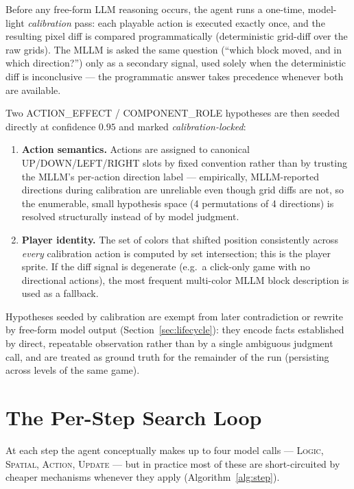 \documentclass{article}
\begin{document}
Before any free-form LLM reasoning occurs, the agent runs a one-time,
model-light \emph{calibration} pass: each playable action is executed
exactly once, and the resulting pixel diff is compared programmatically
(deterministic grid-diff over the raw grids). The MLLM is asked the same
question (``which block moved, and in which direction?'') only as a
secondary signal, used solely when the deterministic diff is
inconclusive — the programmatic answer takes precedence whenever both
are available.

Two ACTION\_EFFECT / COMPONENT\_ROLE hypotheses are then seeded directly
at confidence $0.95$ and marked \emph{calibration-locked}:

\begin{enumerate}[nosep]
\item \textbf{Action semantics.} Actions are assigned to canonical
UP/DOWN/LEFT/RIGHT slots by fixed convention rather than by trusting the
MLLM's per-action direction label — empirically, MLLM-reported
directions during calibration are unreliable even though grid diffs are
not, so the enumerable, small hypothesis space (4 permutations of 4
directions) is resolved structurally instead of by model judgment.
\item \textbf{Player identity.} The set of colors that shifted position
consistently across \emph{every} calibration action is computed by
set intersection; this is the player sprite. If the diff signal is
degenerate (e.g.\ a click-only game with no directional actions), the
most frequent multi-color MLLM block description is used as a
fallback.
\end{enumerate}

Hypotheses seeded by calibration are exempt from later contradiction or
rewrite by free-form model output (Section~\ref{sec:lifecycle}): they
encode facts established by direct, repeatable observation rather than
by a single ambiguous judgment call, and are treated as ground truth
for the remainder of the run (persisting across levels of the same
game).

\section{The Per-Step Search Loop}
\label{sec:loop}

At each step the agent conceptually makes up to four model calls —
\textsc{Logic}, \textsc{Spatial}, \textsc{Action}, \textsc{Update} — but
in practice most of these are short-circuited by cheaper mechanisms
whenever they apply (Algorithm~\ref{alg:step}).
\end{document}
